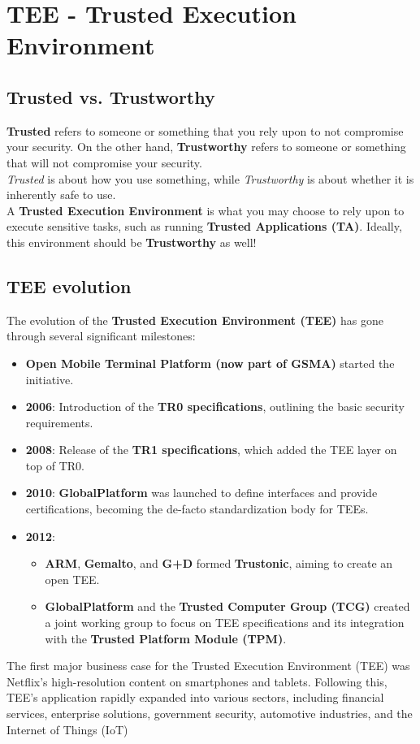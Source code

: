 \section{TEE - Trusted Execution Environment}

\subsection{Trusted vs. Trustworthy}

\textbf{Trusted} refers to someone or something that you rely upon to not compromise your security. On the other hand, \textbf{Trustworthy} refers to someone or something that will not compromise your security. \\
\textit{Trusted} is about how you use something, while \textit{Trustworthy} is about whether it is inherently safe to use. \\
A \textbf{Trusted Execution Environment} is what you may choose to rely upon to execute sensitive tasks, such as running \textbf{Trusted Applications (TA)}. Ideally, this environment should be \textbf{Trustworthy} as well!

\subsection{TEE evolution}
The evolution of the \textbf{Trusted Execution Environment (TEE)} has gone through several significant milestones:

\begin{itemize}
    \item \textbf{Open Mobile Terminal Platform (now part of GSMA)} started the initiative.
    \item \textbf{2006}: Introduction of the \textbf{TR0 specifications}, outlining the basic security requirements.
    \item \textbf{2008}: Release of the \textbf{TR1 specifications}, which added the TEE layer on top of TR0.
    \item \textbf{2010}: \textbf{GlobalPlatform} was launched to define interfaces and provide certifications, becoming the de-facto standardization body for TEEs.
    \item \textbf{2012}:
    \begin{itemize}
        \item \textbf{ARM}, \textbf{Gemalto}, and \textbf{G+D} formed \textbf{Trustonic}, aiming to create an open TEE.
        \item \textbf{GlobalPlatform} and the \textbf{Trusted Computer Group (TCG)} created a joint working group to focus on TEE specifications and its integration with the \textbf{Trusted Platform Module (TPM)}.
    \end{itemize}
\end{itemize}
The first major business case for the Trusted Execution Environment (TEE) was Netflix's high-resolution content on smartphones and tablets. Following this, TEE's application rapidly expanded into various sectors, including financial services, enterprise solutions, government security, automotive industries, and the Internet of Things (IoT)

